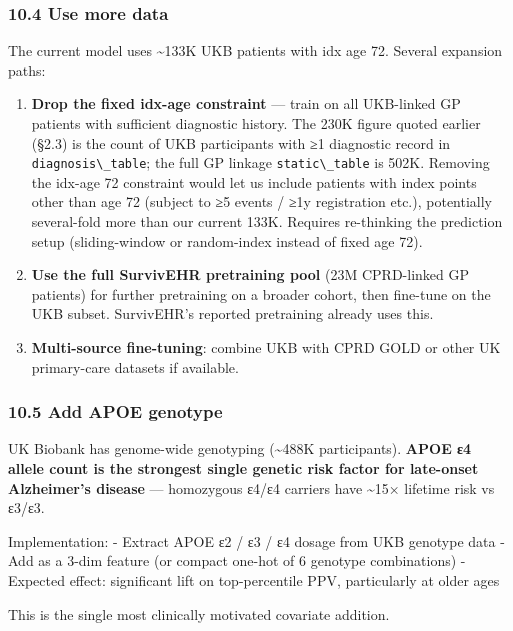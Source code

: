 \documentclass[
  11pt,
]{article}
\newcommand{\passthrough}[1]{#1}
\providecommand{\tightlist}{%
  \setlength{\itemsep}{0pt}\setlength{\parskip}{0pt}}
\begin{document}
\subsubsection{10.4 Use more data}\label{use-more-data}

The current model uses \textasciitilde133K UKB patients with idx age 72.
Several expansion paths:

\begin{enumerate}
\def\labelenumi{\arabic{enumi}.}
\tightlist
\item
  \textbf{Drop the fixed idx-age constraint} --- train on all UKB-linked
  GP patients with sufficient diagnostic history. The 230K figure quoted
  earlier (§2.3) is the count of UKB participants with ≥1 diagnostic
  record in \passthrough{\lstinline!diagnosis\_table!}; the full GP
  linkage \passthrough{\lstinline!static\_table!} is 502K. Removing the
  idx-age 72 constraint would let us include patients with index points
  other than age 72 (subject to ≥5 events / ≥1y registration etc.),
  potentially several-fold more than our current 133K. Requires
  re-thinking the prediction setup (sliding-window or random-index
  instead of fixed age 72).
\item
  \textbf{Use the full SurvivEHR pretraining pool} (23M CPRD-linked GP
  patients) for further pretraining on a broader cohort, then fine-tune
  on the UKB subset. SurvivEHR's reported pretraining already uses this.
\item
  \textbf{Multi-source fine-tuning}: combine UKB with CPRD GOLD or other
  UK primary-care datasets if available.
\end{enumerate}

\subsubsection{10.5 Add APOE genotype}\label{add-apoe-genotype}

UK Biobank has genome-wide genotyping (\textasciitilde488K
participants). \textbf{APOE ε4 allele count is the strongest single
genetic risk factor for late-onset Alzheimer's disease} --- homozygous
ε4/ε4 carriers have \textasciitilde15× lifetime risk vs ε3/ε3.

Implementation: - Extract APOE ε2 / ε3 / ε4 dosage from UKB genotype
data - Add as a 3-dim feature (or compact one-hot of 6 genotype
combinations) - Expected effect: significant lift on top-percentile PPV,
particularly at older ages

This is the single most clinically motivated covariate addition.
\end{document}
